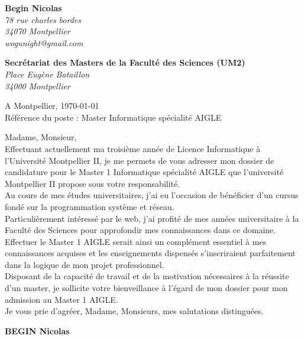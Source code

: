 \documentclass[11pt]{letter}
\begin{document}
 \sffamily
 \hfill
 \begin{flushleft}
 {\bfseries Begin Nicolas}\\[.35ex]
 \small\itshape
 78 rue charles bordes\\
 34070 Montpellier\\[.35ex]
 wogunight@gmail.com
 \end{flushleft}
 \begin{flushright}
 {\bfseries Secrétariat des Masters de la Faculté des Sciences (UM2)}\\[.35ex]
 \small\itshape
 Place Eugène Bataillon\\
 34000 Montpellier
 \end{flushright}
 \hfill
 \begin{flushright}
 A Montpellier, \today \\
 Référence du poste : Master Informatique spécialité AIGLE
 \end{flushright}
 Madame, Monsieur,\\

Effectuant actuellement ma troisième année de Licence Informatique à l’Université Montpellier II, je me permets de vous adresser mon dossier de candidature pour le Master 1 Informatique spécialité AIGLE que l’université Montpellier II propose sous votre responsabilité. \\

Au cours de mes études universitaires, j’ai eu l’occasion de bénéficier d’un cursus fondé sur la programmation système et réseau. \\

Particulièrement intéressé par le web, j’ai profité de mes années universitaire à la Faculté des Sciences pour approfondir mes connaissances dans ce domaine.\\

Effectuer le Master 1 AIGLE serait ainsi un complément essentiel à mes connaissances acquises et les enseignements dispensés s’inscriraient parfaitement dans la logique de mon projet professionnel. \\

Disposant de la capacité de travail et de la motivation nécessaires à la réussite d’un master, je sollicite votre bienveillance à l’égard de mon dossier pour mon admission au Master 1 AIGLE. \\

Je vous prie d'agréer, Madame, Monsieurs, mes salutations distinguées.\\
 \begin{center}
 {\bfseries BEGIN Nicolas}\\
 \end{center}
 \vfill
 
\end{document}
